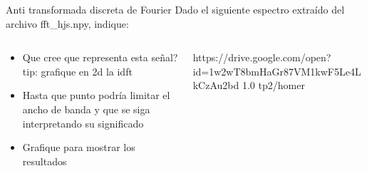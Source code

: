  \begin{frame}{Anti transformada discreta de Fourier}
  Dado el siguiente espectro extraído del archivo fft\_hjs.npy, indique:
   \begin{columns}[c]
      \hspace{2pt}
      \begin{column}{.6\textwidth}
    \begin{itemize}
       \item{Que cree que representa esta señal?  \footnotesize{tip: grafique en 2d la idft}}
       \item{Hasta que punto podría limitar el ancho de banda y que se siga interpretando su significado}
       \item{Grafique para mostrar los resultados}
    \end{itemize}
      \end{column}
      \hspace{2pt}
      \vrule
      \hspace{2pt}
      \begin{column}{.4\textwidth}
         {https://drive.google.com/open?id=1w2wT8bmHaGr87VM1kwF5Le4LkCzAu2bd}
         {1.0}
         {tp2/homer}
      \end{column}
      \hspace{2pt}
   \end{columns}
 \end{frame}
